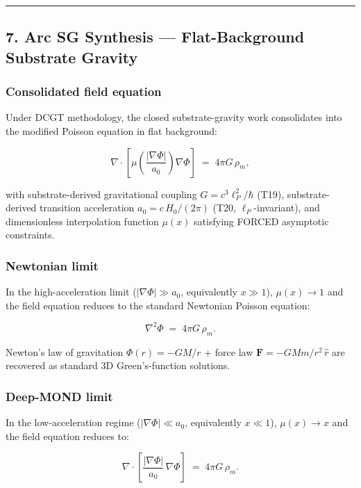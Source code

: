 \documentclass[
  11pt,a4paper]{article}
\begin{document}
\begin{center}\rule{0.5\linewidth}{0.5pt}\end{center}

\subsection{7. Arc SG Synthesis --- Flat-Background Substrate
Gravity}\label{arc-sg-synthesis-flat-background-substrate-gravity}

\subsubsection{Consolidated field
equation}\label{consolidated-field-equation}

Under DCGT methodology, the closed substrate-gravity work consolidates
into the modified Poisson equation in flat background:

\[\boxed{\;\nabla\cdot\!\left[\mu\!\left(\frac{|\nabla\Phi|}{a_0}\right)\nabla\Phi\right] \;=\; 4\pi G\,\rho_m,\;}\]

with substrate-derived gravitational coupling \(G = c^3\ell_P^2/\hbar\)
(T19), substrate-derived transition acceleration \(a_0 = c\,H_0/(2\pi)\)
(T20, \(\ell_P\)-invariant), and dimensionless interpolation function
\(\mu(x)\) satisfying FORCED asymptotic constraints.

\subsubsection{Newtonian limit}\label{newtonian-limit}

In the high-acceleration limit (\(|\nabla\Phi| \gg a_0\), equivalently
\(x \gg 1\)), \(\mu(x) \to 1\) and the field equation reduces to the
standard Newtonian Poisson equation:

\[\nabla^2\Phi \;=\; 4\pi G\,\rho_m.\]

Newton's law of gravitation \(\Phi(r) = -GM/r\) + force law
\(\mathbf{F} = -GMm/r^2\,\hat r\) are recovered as standard 3D
Green's-function solutions.

\subsubsection{Deep-MOND limit}\label{deep-mond-limit}

In the low-acceleration regime (\(|\nabla\Phi| \ll a_0\), equivalently
\(x \ll 1\)), \(\mu(x) \to x\) and the field equation reduces to:

\[\nabla\cdot\!\left[\frac{|\nabla\Phi|}{a_0}\,\nabla\Phi\right] \;=\; 4\pi G\,\rho_m.\]
\end{document}
